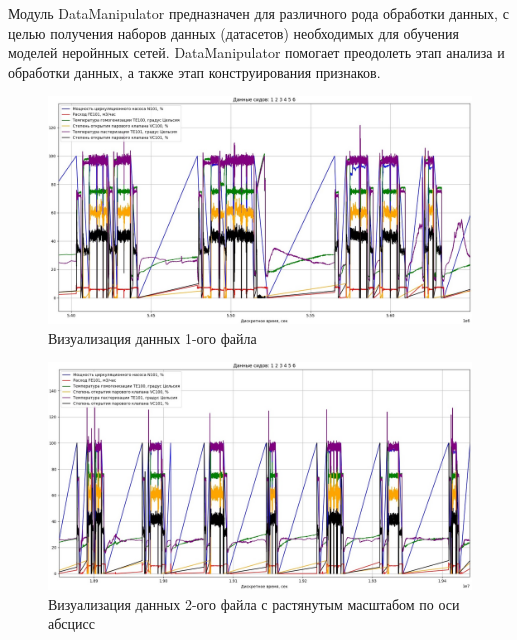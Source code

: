 {\standartFont

  \par Модуль DataManipulator предназначен для различного рода обработки данных, с целью получения наборов данных (датасетов) необходимых для обучения моделей неройнных сетей. DataManipulator помогает преодолеть этап анализа и обработки данных, а также этап конструирования признаков.

  \par

  \begin{figure}
    \centering
    \def\svgwidth{\textwidth}
    \includegraphics[scale=0.6]{images/forGeneral/data_1_visual.jpg}
    \caption{Визуализация данных 1-ого файла}
    \label{fig:Data1Visual}
  \end{figure} 

  \begin{figure}
    \centering
    \def\svgwidth{\textwidth}
    \includegraphics[scale=0.6]{images/forGeneral/data_2_visual.jpg}
    \caption{ Визуализация данных 2-ого файла с растянутым масштабом по оси абсцисс}
    \label{fig:Data2Visual}
  \end{figure} 

}
